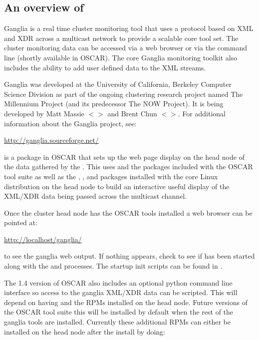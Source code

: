 %
%
%

\subsection{An overview of }
\label{app:ganglia-overview}

Ganglia is a real time cluster monitoring tool that uses a protocol
based on XML and XDR across a multicast network to provide a scalable
core tool set.  The cluster monitoring data can be accessed via a web
browser or via the command line (shortly available in OSCAR). The core
Ganglia monitoring toolkit also includes the ability to add user
defined data to the XML streams.

Ganglia was developed at the University of California, Berkeley
Computer Science Division as part of the ongoing clustering research
project named The Millennium Project (and its predecessor The NOW
Project).  It is being developed by Matt Massie
$<$$>$ and Brent Chun
$<$$>$. For additional information about the
Ganglia project, see:

\vspace{10pt}
\centerline{\url{http://ganglia.sourceforge.net/}}
\vspace{10pt}

 is a package in OSCAR that sets up
the web page display on the head node of the data gathered by the
.  This uses  and the
 packages included with the OSCAR tool suite
as well as the , , and 
packages installed with the core Linux distribution on the head node
to build an interactive useful display of the XML/XDR data being
passed across the multicast channel.

Once the cluster head node has the OSCAR tools installed a web browser
can be pointed at:

\vspace{10pt}
\centerline{\url{http://localhost/ganglia/}}
\vspace{10pt}

\noindent to see the ganglia web output. If nothing appears, check to
see if  has been started along with the  and
 processes. The startup init scripts can be found
in .

The 1.4 version of OSCAR also includes an optional  python
command line interface so access to the ganglia XML/XDR data can be
scripted. This will depend on having  and the
 RPMs installed on the head node.
Future versions of the OSCAR tool suite this will be installed by default
when the rest of the ganglia tools are installed. Currently these additional
RPMs can either be installed on the head node after the install by doing:

